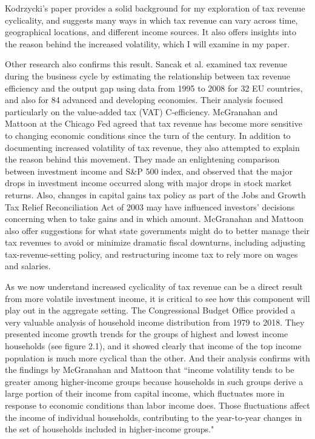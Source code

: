 \documentclass{article}
\begin{document}
Kodrzycki's paper provides a solid background for my exploration of tax revenue cyclicality, and suggests many ways in which tax revenue can vary across time, geographical locations, and different income sources. It also offers insights into the reason behind the increased volatility, which I will examine in my paper. 

Other research also confirms this result. Sancak et al. examined tax revenue during the business cycle by estimating the relationship between tax revenue efficiency and the output gap using data from 1995 to 2008 for 32 EU countries, and also for 84 advanced and developing economies. Their analysis focused particularly on the value-added tax (VAT) C-efficiency. McGranahan and Mattoon at the Chicago Fed agreed that tax revenue has become more sensitive to changing economic conditions since the turn of the century. In addition to documenting increased volatility of tax revenue, they also attempted to explain the reason behind this movement. They made an enlightening comparison between investment income and S\&P 500 index, and observed that the major drops in investment income occurred along with major drops in stock market returns. Also, changes in capital gains tax policy as part of the Jobs and Growth Tax Relief Reconciliation Act of 2003 may have influenced investors' decisions concerning when to take gains and in which amount. McGranahan and Mattoon also offer suggestions for what state governments might do to better manage their tax revenues to avoid or minimize dramatic fiscal downturns, including adjusting tax-revenue-setting policy, and restructuring income tax to rely more on wages and salaries. 

As we now understand increased cyclicality of tax revenue can be a direct result from more volatile investment income, it is critical to see how this component will play out in the aggregate setting. The Congressional Budget Office provided a very valuable analysis of household income distribution from 1979 to 2018. They presented income growth trends for the groups of highest and lowest income households (see figure 2.1), and it showed clearly that income of the top income population is much more cyclical than the other. And their analysis confirms with the findings by McGranahan and Mattoon that ``income volatility tends to be greater among higher-income groups because households in such groups derive a large portion of their income from capital income, which fluctuates more in response to economic conditions than labor income does. Those fluctuations affect the income of individual households, contributing to the year-to-year changes in the set of households included in higher-income groups."
\end{document}

